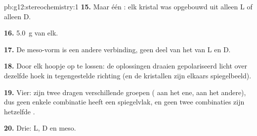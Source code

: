 \begin{solution}{pb:g12:stereochemistry:1}
\textbf{15.} Maar één : elk kristal was opgebouwd uit alleen L
of alleen D.

\textbf{16.} \qty{5.0}{g} van elk.

\textbf{17.} De meso-vorm is een andere verbinding, geen deel van het
 van L en D.

\textbf{18.} Door elk hoopje op te lossen: de oplossingen draaien
gepolariseerd licht over dezelfde hoek in tegengestelde richting (en de
kristallen zijn elkaars spiegelbeeld).

\textbf{19.} Vier: zijn twee  dragen
verschillende groepen ( aan het ene,  aan het andere), dus
geen enkele combinatie heeft een spiegelvlak, en geen twee combinaties
zijn hetzelfde .

\textbf{20.} Drie: L, D en meso.
\end{solution}
